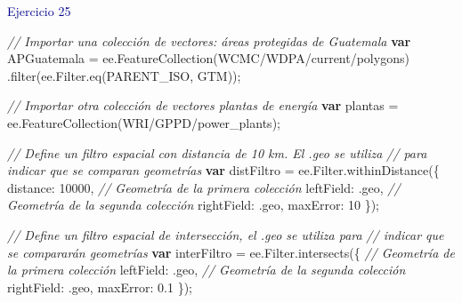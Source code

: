 \documentclass[
  12pt,
  letterpaper,
  twoside]{book}
\newenvironment{Shaded}{\begin{snugshade}}{\end{snugshade}}
\newcommand{\AttributeTok}[1]{\textcolor[rgb]{0.48,0.12,0.64}{#1}}
\newcommand{\CommentTok}[1]{\textcolor[rgb]{0.24,0.58,0.00}{\textit{#1}}}
\newcommand{\DataTypeTok}[1]{\textcolor[rgb]{0.00,0.00,0.00}{#1}}
\newcommand{\DecValTok}[1]{\textcolor[rgb]{0.28,0.53,0.93}{#1}}
\newcommand{\FloatTok}[1]{\textcolor[rgb]{0.28,0.53,0.93}{#1}}
\newcommand{\FunctionTok}[1]{\textcolor[rgb]{0.48,0.12,0.64}{#1}}
\newcommand{\KeywordTok}[1]{\textcolor[rgb]{0.00,0.00,0.00}{\textbf{#1}}}
\newcommand{\NormalTok}[1]{#1}
\newcommand{\OperatorTok}[1]{\textcolor[rgb]{0.00,0.00,0.00}{#1}}
\newcommand{\StringTok}[1]{\textcolor[rgb]{0.87,0.29,0.22}{#1}}
\begin{document}
\textcolor{darkblue}{Ejercicio 25}

\begin{Shaded}
\begin{Highlighting}[]
\CommentTok{// Importar una colección de vectores: áreas protegidas de Guatemala}
\KeywordTok{var}\NormalTok{ APGuatemala }\OperatorTok{=}\NormalTok{ ee}\OperatorTok{.}\FunctionTok{FeatureCollection}\NormalTok{(}\StringTok{\textquotesingle{}WCMC/WDPA/current/polygons\textquotesingle{}}\NormalTok{)}
  \OperatorTok{.}\FunctionTok{filter}\NormalTok{(ee}\OperatorTok{.}\AttributeTok{Filter}\OperatorTok{.}\FunctionTok{eq}\NormalTok{(}\StringTok{\textquotesingle{}PARENT\_ISO\textquotesingle{}}\OperatorTok{,} \StringTok{\textquotesingle{}GTM\textquotesingle{}}\NormalTok{))}\OperatorTok{;}

\CommentTok{// Importar otra colección de vectores plantas de energía}
\KeywordTok{var}\NormalTok{ plantas }\OperatorTok{=}\NormalTok{ ee}\OperatorTok{.}\FunctionTok{FeatureCollection}\NormalTok{(}\StringTok{\textquotesingle{}WRI/GPPD/power\_plants\textquotesingle{}}\NormalTok{)}\OperatorTok{;}

\CommentTok{// Define un filtro espacial con distancia de 10 km. El .geo se utiliza }
\CommentTok{// para indicar que se comparan geometrías}
\KeywordTok{var}\NormalTok{ distFiltro }\OperatorTok{=}\NormalTok{ ee}\OperatorTok{.}\AttributeTok{Filter}\OperatorTok{.}\FunctionTok{withinDistance}\NormalTok{(\{}
  \DataTypeTok{distance}\OperatorTok{:} \DecValTok{10000}\OperatorTok{,}
  \CommentTok{// Geometría de la primera colección}
  \DataTypeTok{leftField}\OperatorTok{:} \StringTok{\textquotesingle{}.geo\textquotesingle{}}\OperatorTok{,} 
  \CommentTok{// Geometría de la segunda colección}
  \DataTypeTok{rightField}\OperatorTok{:} \StringTok{\textquotesingle{}.geo\textquotesingle{}}\OperatorTok{,} 
  \DataTypeTok{maxError}\OperatorTok{:} \DecValTok{10}
\NormalTok{\})}\OperatorTok{;}

\CommentTok{// Define un filtro espacial de intersección, el .geo se utiliza para }
\CommentTok{// indicar que se compararán geometrías}
\KeywordTok{var}\NormalTok{ interFiltro }\OperatorTok{=}\NormalTok{ ee}\OperatorTok{.}\AttributeTok{Filter}\OperatorTok{.}\FunctionTok{intersects}\NormalTok{(\{}
  \CommentTok{// Geometría de la primera colección}
  \DataTypeTok{leftField}\OperatorTok{:} \StringTok{\textquotesingle{}.geo\textquotesingle{}}\OperatorTok{,} 
  \CommentTok{// Geometría de la segunda colección}
  \DataTypeTok{rightField}\OperatorTok{:} \StringTok{\textquotesingle{}.geo\textquotesingle{}}\OperatorTok{,} 
  \DataTypeTok{maxError}\OperatorTok{:} \FloatTok{0.1}
\NormalTok{\})}\OperatorTok{;}


\end{Highlighting}
\end{Shaded}
\end{document}
